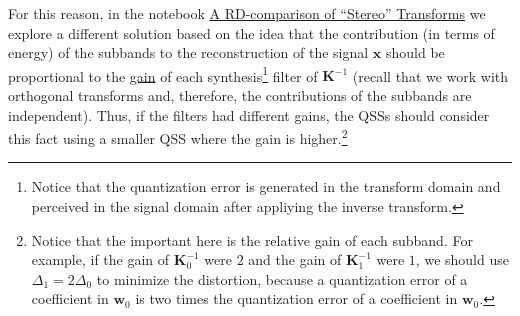 For this reason, in the notebook
\href{https://github.com/Tecnologias-multimedia/Tecnologias-multimedia.github.io/blob/master/contents/transform_coding/stereo_transforms_RD.ipynb}{A
  RD-comparison of ``Stereo'' Transforms} we explore a different
solution based on the idea that the contribution (in terms of energy)
of the subbands to the reconstruction of the signal ${\mathbf x}$
should be proportional to the
\href{https://en.wikipedia.org/wiki/Filter_(signal_processing)}{gain}
of each synthesis\footnote{Notice that the quantization error is
  generated in the transform domain and perceived in the signal domain
  after appliying the inverse transform.} filter of ${\mathbf K}^{-1}$
(recall that we work with orthogonal transforms and, therefore, the contributions of the subbands are independent). Thus, if
the filters had different gains, the QSSs should consider this fact
using a smaller QSS where the gain is higher.\footnote{Notice that the
  important here is the relative gain of each subband. For example, if
  the gain of ${\mathbf K}_0^{-1}$ were $2$ and the gain of
  ${\mathbf K}_1^{-1}$ were $1$, we should use $\Delta_1=2\Delta_0$ to
  minimize the distortion, because a quantization error of a
  coefficient in $\mathbf{w}_0$ is two times the quantization error of
  a coefficient in $\mathbf{w}_0$.}

